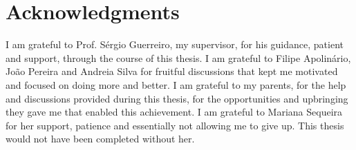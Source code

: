 \chapter*{Acknowledgments}

I am grateful to Prof. Sérgio Guerreiro, my supervisor, for his guidance, patient and support, through the course of this thesis. I am grateful to Filipe Apolinário, João Pereira and Andreia Silva for fruitful discussions that kept me motivated and focused on doing more and better. I am grateful to my parents, for the help and discussions provided during this thesis, for the opportunities and upbringing they gave me that enabled this achievement. I am grateful to Mariana Sequeira for her support, patience and essentially not allowing me to give up. This thesis would not have been completed without her.